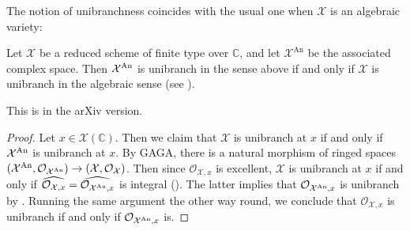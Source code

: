 The notion of unibranchness coincides with the usual one when $\mathcal{X}$ is an algebraic variety:
\begin{proposition}\label{prop:unibranch_gaga}
    Let $\mathcal{X}$ be a reduced scheme of finite type over $\mathbb{C}$, and let $\mathcal{X}^{\mathrm{An}}$ be the associated complex space.
    Then $\mathcal{X}^{\mathrm{An}}$ is unibranch in the sense above if and only if $\mathcal{X}$ is unibranch in the algebraic sense (see \cite[\href{https://stacks.math.columbia.edu/tag/0BQ2}{Tag 0BQ2}]{stacks-project}).
\end{proposition}
This is \cite[Remark~2.7]{Xia23Mabuchi} in the arXiv version.
\begin{proof}
    Let $x\in \mathcal{X}(\mathbb{C})$. Then we claim that $\mathcal{X}$ is unibranch at $x$ if and only if $\mathcal{X}^{\mathrm{An}}$ is unibranch at $x$. By GAGA, there is a natural morphism of ringed spaces $(\mathcal{X}^{\mathrm{An}},\mathcal{O}_{\mathcal{X}^{\mathrm{An}}})\rightarrow (\mathcal{X},\mathcal{O}_{\mathcal{X}})$.
	 Then since $\mathcal{O}_{\mathcal{X},x}$ is excellent, $\mathcal{X}$ is unibranch at $x$ if and only if $\widehat{\mathcal{O}_{\mathcal{X},x}}=\widehat{\mathcal{O}_{\mathcal{X}^{\mathrm{An}},x}}$ is integral (\cite[Théorème~18.9.1]{EGAIV4}). The latter implies that $\mathcal{O}_{\mathcal{X}^{\mathrm{An}},x}$ is unibranch by \cite[Chapitre~5, Exercise~2.8]{AC}. Running the same argument the other way round, we conclude that $\mathcal{O}_{\mathcal{X},x}$ is unibranch if and only if $\mathcal{O}_{\mathcal{X}^{\mathrm{An}},x}$ is.
\end{proof}

